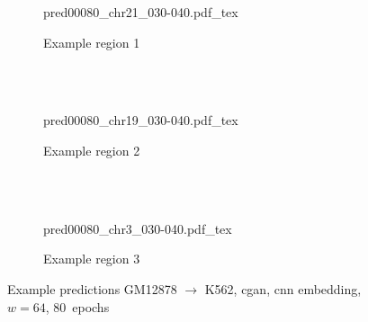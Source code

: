 \begin{figure}[p] %
    \begin{subfigure}{\textwidth}
        \centering
        \scriptsize
        {pred00080_chr21_030-040.pdf_tex}
        \caption{Example  region 1} \label{fig:results:cGAN64_r1}
    \end{subfigure}\\[2mm]
    \\[3mm]
    \begin{subfigure}{\textwidth}
        \centering
        \scriptsize
        {pred00080_chr19_030-040.pdf_tex}
        \caption{Example region 2} \label{fig:results:cGAN64_r2}
    \end{subfigure}\\[2mm]
    \\[3mm]
    \begin{subfigure}{\textwidth}
        \centering
        \scriptsize
        {pred00080_chr3_030-040.pdf_tex}
        \caption{Example region 3} \label{fig:results:cGAN64_r3}
    \end{subfigure}
    \caption{Example predictions GM12878 $\rightarrow$ K562, \acrshort{cgan}, \acrshort{cnn} embedding, $w=64$, 80~epochs}
    \label{fig:results:cGAN64_matrices}
\end{figure} 


